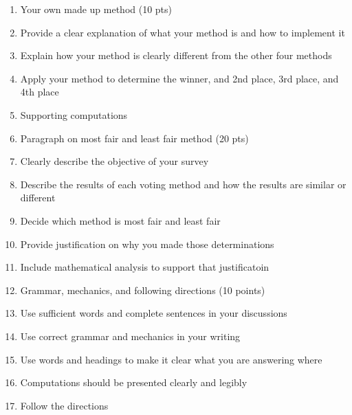 \begin{enumerate}
\item Your own made up method (10 pts)
\bi
\item Provide a clear explanation of what your method is and how to implement it
\item Explain how your method is clearly different from the other four methods
\item Apply your method to determine the winner,  and  2nd place, 3rd place, and 4th place 
\item Supporting computations
\ei

\item Paragraph on most fair and least fair method (20 pts)
\bi
\item Clearly describe the objective of your survey
\item Describe the results of each voting method and how the results are similar or different
\item Decide which method is most fair and least fair
\item Provide justification on why you made those determinations
\item Include mathematical analysis to support that justificatoin
\ei

\item Grammar, mechanics, and following directions (10 points)
\bi
\item Use sufficient words and complete sentences in your discussions
\item Use correct grammar and mechanics in your writing
\item Use words and headings to make it clear what you are answering where
\item Computations should be presented clearly and legibly
\item Follow the directions
\ei



\end{enumerate}

